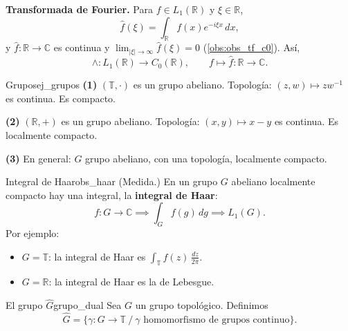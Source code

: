 \textbf{Transformada de Fourier.} Para $f \in L_1(\mathbb{R})$ y $\xi \in \mathbb{R}$,
\[
\hat{f}(\xi) = \int_{\mathbb{R}}f(x)e^{-i\xi x}\,dx,
\]
y $\hat{f} : \mathbb{R} \to \mathbb{C}$ es continua y $\lim_{|\xi|\to\infty}\hat{f}(\xi) = 0$ (\cref{obs:obs_tf_c0}). Así,
\[
\wedge : L_1(\mathbb{R}) \longrightarrow C_0(\mathbb{R}), \qquad f \longmapsto \hat{f} : \mathbb{R} \to \mathbb{C}.
\]

\begin{ejemplo}{Grupos}{ej_grupos}
\textbf{(1)} $(\mathbb{T}, \cdot)$ es un grupo abeliano. Topología: $(z, w) \mapsto zw^{-1}$ es continua. Es compacto.

\textbf{(2)} $(\mathbb{R}, +)$ es un grupo abeliano. Topología: $(x, y) \mapsto x - y$ es continua. Es localmente compacto.

\textbf{(3)} En general: $G$ grupo abeliano, con una topología, localmente compacto.
\end{ejemplo}

\begin{observacion}{Integral de Haar}{obs_haar}
(Medida.) En un grupo $G$ abeliano localmente compacto hay una integral, la \textbf{integral de Haar}:
\[
f : G \to \mathbb{C} \implies \int_G f(g)\,dg \implies L_1(G).
\]
Por ejemplo:
\begin{itemize}
\item $G = \mathbb{T}$: la integral de Haar es $\int_{\mathbb{T}}f(z)\,\frac{dz}{2\pi}$.
\item $G = \mathbb{R}$: la integral de Haar es la de Lebesgue.
\end{itemize}
\end{observacion}

\begin{definicion}{El grupo $\hat{G}$}{grupo_dual}
Sea $G$ un grupo topológico. Definimos
\[
\hat{G} = \big\{\gamma : G \to \mathbb{T} \ \big/\ \gamma \text{ homomorfismo de grupos continuo}\big\}.
\]
\end{definicion}

